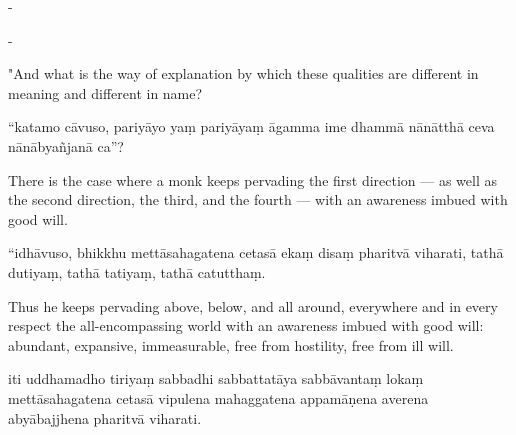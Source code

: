 \begin{samepage}
\begin{leftcolumn*}
-
\end{leftcolumn*}

\begin{rightcolumn}
-
\end{rightcolumn}
\end{samepage}

\begin{samepage}
\begin{leftcolumn*}
"And what is the way of explanation by which these qualities are different in meaning and different in name?
\end{leftcolumn*}

\begin{rightcolumn}
“katamo cāvuso, pariyāyo yaṃ pariyāyaṃ āgamma ime dhammā nānātthā ceva nānābyañjanā ca”?
\end{rightcolumn}
\end{samepage}

\begin{samepage}
\begin{leftcolumn*}
There is the case where a monk keeps pervading the first direction — as well as the second direction, the third, and the fourth — with an awareness imbued with good will.
\end{leftcolumn*}

\begin{rightcolumn}
“idhāvuso, bhikkhu mettāsahagatena cetasā ekaṃ disaṃ pharitvā viharati, tathā dutiyaṃ, tathā tatiyaṃ, tathā catutthaṃ.
\end{rightcolumn}
\end{samepage}

\begin{samepage}
\begin{leftcolumn*}
Thus he keeps pervading above, below, and all around, everywhere and in every respect the all-encompassing world with an awareness imbued with good will: abundant, expansive, immeasurable, free from hostility, free from ill will.
\end{leftcolumn*}

\begin{rightcolumn}
iti uddhamadho tiriyaṃ sabbadhi sabbattatāya sabbāvantaṃ lokaṃ mettāsahagatena cetasā vipulena mahaggatena appamāṇena averena abyābajjhena pharitvā viharati.
\end{rightcolumn}
\end{samepage}

